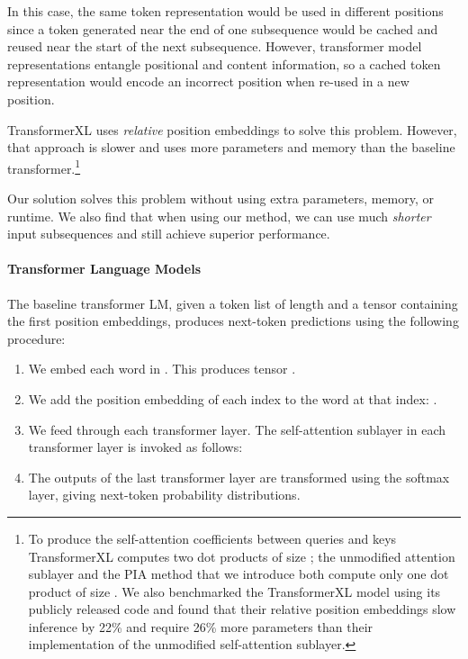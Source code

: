 \documentclass[11pt,a4paper]{article}
\begin{document}
In this case, the same token representation would be used in different positions since a token generated near the end of one subsequence would be cached and reused near the start of the next subsequence. However, transformer model representations entangle positional and content information, so a cached token representation would encode an incorrect position when re-used in a new position. 

TransformerXL \citep{transformer-xl} uses \emph{relative} position embeddings to solve this problem. However, that approach is slower and uses more parameters and memory than the baseline transformer.\footnote{To produce the self-attention coefficients between  queries and  keys TransformerXL computes two dot products of size ; the unmodified attention sublayer and the PIA method that we introduce both compute only  one dot product of size . We also benchmarked the TransformerXL model using its publicly released code and found that their relative position embeddings slow inference by 22\% and require 26\% more parameters than their implementation of the unmodified self-attention sublayer. } 

Our solution solves this problem without using extra parameters, memory, or runtime. We also find that when using our method, we can use much \emph{shorter} input subsequences and still achieve superior performance. 


\paragraph{Transformer Language Models}

The baseline transformer LM, given a token list  of length  and a tensor  containing the first  position embeddings, produces  next-token predictions using the following procedure:

\begin{enumerate}
    \item We embed each word in . This produces tensor .  
    \item \label{step:pos} We add the position embedding of each index to the word at that index: .
    \item We feed  through each transformer layer. The self-attention sublayer in each transformer layer is invoked as follows: 

    

    \item The outputs of the last transformer layer are transformed using the softmax layer, giving  next-token probability distributions. 
\end{enumerate}
\end{document}
